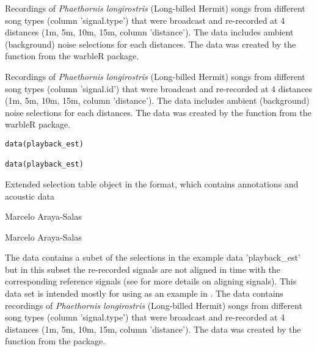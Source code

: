 \documentclass[letterpaper]{book}
\begin{document}
%
\begin{Description}\relax
Recordings of \emph{Phaethornis longirostris} (Long-billed Hermit) songs from different song types (column 'signal.type') that were broadcast and re-recorded at 4 distances (1m, 5m, 10m, 15m, column 'distance'). The data includes ambient (background) noise selections for each distances. The data was created by the function  from the warbleR package.

Recordings of \emph{Phaethornis longirostris} (Long-billed Hermit) songs from different song types (column 'signal.id') that were broadcast and re-recorded at 4 distances (1m, 5m, 10m, 15m, column 'distance'). The data includes ambient (background) noise selections for each distances. The data was created by the function  from the warbleR package.
\end{Description}
%
\begin{Usage}
\begin{verbatim}
data(playback_est)

data(playback_est)
\end{verbatim}
\end{Usage}
%
\begin{Format}
Extended selection table object in the  format, which contains annotations and acoustic data
\end{Format}
%
\begin{Source}\relax
Marcelo Araya-Salas

Marcelo Araya-Salas
\end{Source}
%
\begin{Description}\relax
The data contains a subet of the selections in the example data 'playback\_est' but in this subset the re-recorded signals are not aligned in time with the corresponding reference signals (see  for more details on aligning signals). This data set is intended mostly for using as an example in . The data contains recordings of \emph{Phaethornis longirostris} (Long-billed Hermit) songs from different song types (column 'signal.type') that were broadcast and re-recorded at 4 distances (1m, 5m, 10m, 15m, column 'distance'). The data was created by the function  from the  package.
\end{Description}
\end{document}

